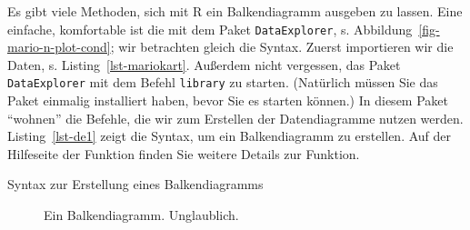 \documentclass[
  letterpaper,
  twoside,
  open=any]{scrbook}
\newenvironment{Shaded}{\begin{snugshade}}{\end{snugshade}}
\newcommand{\FunctionTok}[1]{\textcolor[rgb]{0.28,0.35,0.67}{#1}}
\newcommand{\NormalTok}[1]{\textcolor[rgb]{0.00,0.23,0.31}{#1}}
\newcommand{\SpecialCharTok}[1]{\textcolor[rgb]{0.37,0.37,0.37}{#1}}
\theoremstyle{definition}
\theoremstyle{definition}
\theoremstyle{definition}
\theoremstyle{remark}
\begin{document}
Es gibt viele Methoden, sich mit R ein Balkendiagramm ausgeben zu
lassen. Eine einfache, komfortable ist die mit dem Paket
\texttt{DataExplorer}, s. Abbildung~\ref{fig-mario-n-plot-cond}; wir
betrachten gleich die Syntax. Zuerst importieren wir die Daten, s.
Listing~\ref{lst-mariokart}. Außerdem nicht vergessen, das Paket
\texttt{DataExplorer} mit dem Befehl \texttt{library} zu starten.
(Natürlich müssen Sie das Paket einmalig installiert haben, bevor Sie es
starten können.) In diesem Paket \enquote{wohnen} die Befehle, die wir
zum Erstellen der Datendiagramme nutzen werden. Listing~\ref{lst-de1}
zeigt die Syntax, um ein Balkendiagramm zu erstellen. Auf der Hilfeseite
der Funktion finden Sie weitere Details zur Funktion.

\begin{codelisting}

\caption{\label{lst-de1}Syntax zur Erstellung eines Balkendiagramms}

\centering{

\begin{Shaded}
\begin{Highlighting}[]
\FunctionTok{library}\NormalTok{(DataExplorer)}

\NormalTok{mariokart }\SpecialCharTok{\%\textgreater{}\%} 
  \FunctionTok{select}\NormalTok{(cond) }\SpecialCharTok{\%\textgreater{}\%} 
  \FunctionTok{plot\_bar}\NormalTok{()}
\end{Highlighting}
\end{Shaded}

}

\end{codelisting}%

\begin{figure}[H]


\caption{\label{fig-de1}Ein Balkendiagramm. Unglaublich.}

\end{figure}%
\end{document}
